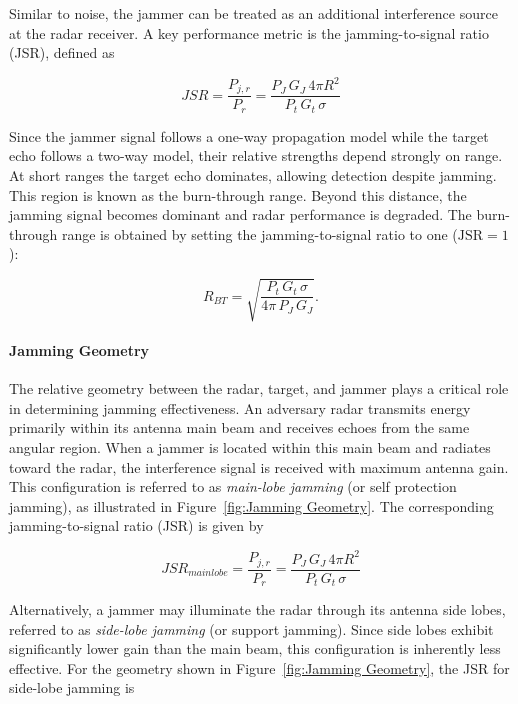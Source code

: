 Similar to noise, the jammer can be treated as an additional interference source at the radar receiver. A key performance metric is the jamming-to-signal ratio (JSR), defined as

\begin{equation}
JSR = \frac{P_{j,r}}{P_r} =  \frac{P_J \, G_J \, 4\pi R^2}{P_t \, G_t \, \sigma}
\end{equation}

Since the jammer signal follows a one-way propagation model while the target echo follows a two-way model, their relative strengths depend strongly on range. At short ranges the target echo dominates, allowing detection despite jamming. This region is known as the burn-through range. Beyond this distance, the jamming signal becomes dominant and radar performance is degraded. The burn-through range is obtained by setting the jamming-to-signal ratio to one ($\text{JSR} = 1$):

\begin{equation}
R_{BT} = \sqrt{\frac{P_t \, G_t \, \sigma}{4\pi \, P_J \, G_J}}.
\end{equation}




\paragraph{Jamming Geometry}

The relative geometry between the radar, target, and jammer plays a critical role in determining jamming effectiveness. An adversary radar transmits energy primarily within its antenna main beam and receives echoes from the same angular region. When a jammer is located within this main beam and radiates toward the radar, the interference signal is received with maximum antenna gain. This configuration is referred to as \emph{main-lobe jamming} (or self protection jamming), as illustrated in Figure~\ref{fig:Jamming Geometry}. The corresponding jamming-to-signal ratio (JSR) is given by


\begin{equation}
JSR_{main lobe} = \frac{P_{j, r}}{P_r} =  \frac{P_J \, G_J \, 4\pi R^2}{P_t \, G_t \, \sigma}
\end{equation}

Alternatively, a jammer may illuminate the radar through its antenna side lobes, referred to as \emph{side-lobe jamming} (or support jamming). Since side lobes exhibit significantly lower gain than the main beam, this configuration is inherently less effective. For the geometry shown in Figure~\ref{fig:Jamming Geometry}, the JSR for side-lobe jamming is

